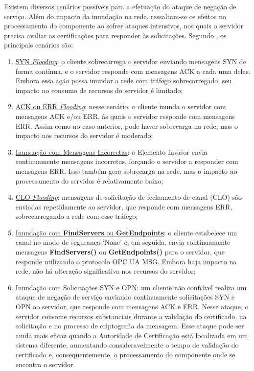         Existem diversos cenários possíveis para a efetuação do ataque de negação de serviço. Além do impacto da inundação na rede, ressaltam-se os efeitos no processamento do componente ao sofrer ataques intensivos, nos quais o servidor precisa avaliar as certificações para responder às solicitações. Segundo , os principais cenários são:

        \begin{enumerate}
            \item \underline{SYN \textit{Flooding}}: o cliente sobrecarrega o servidor enviando mensagens SYN de forma contínua, e o servidor responde com mensagens ACK a cada uma delas. Embora essa ação possa inundar a rede com tráfego sobrecarregado, seu impacto no consumo de recursos do servidor é limitado;
            \item \underline{ACK ou ERR \textit{Flooding}}: nesse cenário, o cliente inunda o servidor com mensagens ACK e/ou ERR, às quais o servidor responde com mensagens ERR. Assim como no caso anterior, pode haver sobrecarga na rede, mas o impacto nos recursos do servidor é moderado;
            \item \underline{Inundação com Mensagens Incorretas}: o Elemento Invasor envia continuamente mensagens incorretas, forçando o servidor a responder com mensagens ERR. Isso também gera sobrecarga na rede, mas o impacto no processamento do servidor é relativamente baixo;
            \item \underline{CLO \textit{Flooding}}: mensagens de solicitação de fechamento de canal (CLO) são enviadas repetidamente ao servidor, que responde com mensagens ERR, sobrecarregando a rede com esse tráfego;
            \item \underline{Inundação com \textbf{FindServers} ou \textbf{GetEndpoints}}: o cliente estabelece um canal no modo de segurança `None' e, em seguida, envia continuamente mensagens \textbf{FindServers()} ou \textbf{GetEndpoints()} para o servidor, que responde utilizando o protocolo OPC UA MSG. Embora haja impacto na rede, não há alteração significativa nos recursos do servidor;
            \item \underline{Inundação com Solicitações SYN e OPN}: um cliente não confiável realiza um ataque de negação de serviço enviando continuamente solicitações SYN e OPN ao servidor, que responde com mensagens ACK e ERR. Nesse ataque, o servidor consome recursos substanciais durante a validação do certificado, na solicitação e no processo de criptografia da mensagem. Esse ataque pode ser ainda mais eficaz quando a Autoridade de Certificação está localizada em um sistema diferente, aumentando consideravelmente o tempo de validação do certificado e, consequentemente, o processamento do componente onde se encontra o servidor.
        \end{enumerate}

